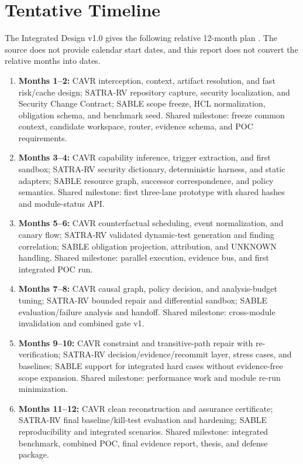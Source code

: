 \section{Tentative Timeline}\label{sec:asent-timeline}
The Integrated Design v1.0 gives the following relative 12-month plan \cite{asentIntegratedResearchDesign}. The source does not provide calendar start dates, and this report does not convert the relative months into dates.
\begin{enumerate}
    \item \textbf{Months 1--2:} CAVR interception, context, artifact resolution, and fast risk/cache design; SATRA-RV repository capture, security localization, and Security Change Contract; SABLE scope freeze, HCL normalization, obligation schema, and benchmark seed. Shared milestone: freeze common context, candidate workspace, router, evidence schema, and POC requirements.
    \item \textbf{Months 3--4:} CAVR capability inference, trigger extraction, and first sandbox; SATRA-RV security dictionary, deterministic harness, and static adapters; SABLE resource graph, successor correspondence, and policy semantics. Shared milestone: first three-lane prototype with shared hashes and module-status API.
    \item \textbf{Months 5--6:} CAVR counterfactual scheduling, event normalization, and canary flow; SATRA-RV validated dynamic-test generation and finding correlation; SABLE obligation projection, attribution, and UNKNOWN handling. Shared milestone: parallel execution, evidence bus, and first integrated POC run.
    \item \textbf{Months 7--8:} CAVR causal graph, policy decision, and analysis-budget tuning; SATRA-RV bounded repair and differential sandbox; SABLE evaluation/failure analysis and handoff. Shared milestone: cross-module invalidation and combined gate v1.
    \item \textbf{Months 9--10:} CAVR constraint and transitive-path repair with re-verification; SATRA-RV decision/evidence/recommit layer, stress cases, and baselines; SABLE support for integrated hard cases without evidence-free scope expansion. Shared milestone: performance work and module re-run minimization.
    \item \textbf{Months 11--12:} CAVR clean reconstruction and assurance certificate; SATRA-RV final baseline/kill-test evaluation and hardening; SABLE reproducibility and integrated scenarios. Shared milestone: integrated benchmark, combined POC, final evidence report, thesis, and defense package.
\end{enumerate}

